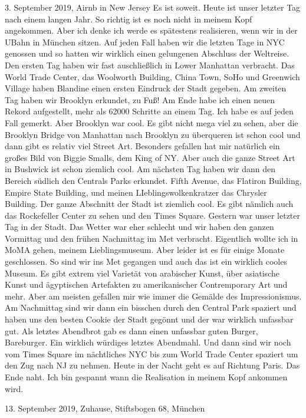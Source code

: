 \documentclass[11pt]{book}
\begin{document}
3. September 2019, Airnb in New Jersey
Es ist soweit. Heute ist unser letzter Tag nach einem langen Jahr. So richtig ist es noch nicht in meinem Kopf angekommen. Aber ich denke ich werde es 
spätestens realisieren, wenn wir in der UBahn in München sitzen. Auf jeden Fall haben wir die letzten Tage in NYC genossen und so hatten wir wirklich einen 
gelungenen Abschluss der Weltreise. Den ersten Tag haben wir fast auschließlich in Lower Manhattan verbracht. Das World Trade Center, das Woolworth Building, 
China Town, SoHo und Greenwich Village haben Blandine einen ersten Eindruck der Stadt gegeben. Am zweiten Tag haben wir Brooklyn erkundet, zu Fuß! Am Ende 
habe ich einen neuen Rekord aufgestellt, mehr als 62000 Schritte an einem Tag. Ich habe es auf jeden Fall gemerkt. Aber Brooklyn war cool. Es gibt nicht mega 
viel zu sehen, aber die Brooklyn Bridge von Manhattan nach Brooklyn zu überqueren ist schon cool und dann gibt es relativ viel Street Art. Besonders gefallen 
hat mir natürlich ein großes Bild von Biggie Smalls, dem King of NY. Aber auch die ganze Street Art in Bushwick ist schon ziemlich cool. Am nächsten Tag 
haben wir dann den Bereich südlich den Centrals Parks erkundet. Fifth Avenue, das Flatiron Building, Empire State Building, und meinen LIeblingswolkenkratzer 
das Chrysler Building. Der ganze Abschnitt der Stadt ist ziemlich cool. Es gibt nämlich auch das Rockefeller Center zu sehen und den Times Square. Gestern 
war unser letzter Tag in der Stadt. Das Wetter war eher schlecht und wir haben den ganzen Vormittag und den frühen Nachmittag im Met verbracht. Eigentlich wollte 
ich in MoMA gehen, meinem Lieblingsmuseum. Aber leider ist es für einige Monate geschlossen. So sind wir ins Met gegangen und auch das ist ein wirklich cooles Museum. 
Es gibt extrem viel Varietät von arabischer Kunst, über asiatische Kunst und ägyptischen Artefakten zu amerikanischer Contremporary Art und mehr. Aber am 
meisten gefallen mir wie immer die Gemälde des Impressionismus. Am Nachmittag sind wir dann ein bisschen durch den Central Park spaziert und haben uns den 
besten Cookie der Stadt gegönnt und der war wirklich unfassbar gut. Als letztes Abendbrot gab es dann einen unfassbar guten Burger, Bareburger.  Ein wirklich 
würdiges letztes Abendmahl. Und dann sind wir noch vom Times Square im nächtliches NYC bis zum World Trade Center spaziert um den Zug nach NJ zu nehmen. 
Heute in der Nacht geht es auf Richtung Paris. Das Ende naht. Ich bin gespannt wann die Realisation in meinem Kopf ankommen wird. 


13. September 2019, Zuhause, Stiftsbogen 68, München
\end{document}
